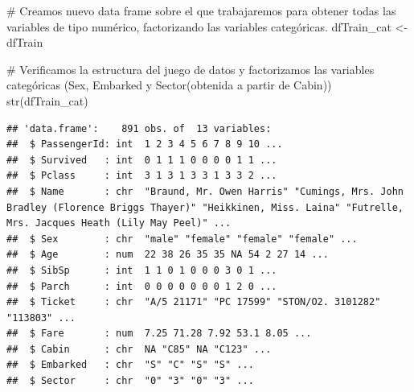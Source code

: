 \documentclass[
]{article}
\newenvironment{Shaded}{\begin{snugshade}}{\end{snugshade}}
\newcommand{\CommentTok}[1]{\textcolor[rgb]{0.50,0.62,0.50}{#1}}
\newcommand{\KeywordTok}[1]{\textcolor[rgb]{0.94,0.87,0.69}{#1}}
\newcommand{\NormalTok}[1]{\textcolor[rgb]{0.80,0.80,0.80}{#1}}
\newcommand{\StringTok}[1]{\textcolor[rgb]{0.80,0.58,0.58}{#1}}
\begin{document}
\begin{Shaded}
\begin{Highlighting}[]
\CommentTok{# Creamos nuevo data frame sobre el que trabajaremos para obtener todas las variables de tipo numérico, factorizando las variables categóricas. }
\NormalTok{dfTrain_cat <-}\StringTok{ }\NormalTok{dfTrain}

\CommentTok{# Verificamos la estructura del juego de datos y factorizamos las variables categóricas (Sex, Embarked y Sector(obtenida a partir de Cabin))}
\KeywordTok{str}\NormalTok{(dfTrain_cat)}
\end{Highlighting}
\end{Shaded}

\begin{verbatim}
## 'data.frame':    891 obs. of  13 variables:
##  $ PassengerId: int  1 2 3 4 5 6 7 8 9 10 ...
##  $ Survived   : int  0 1 1 1 0 0 0 0 1 1 ...
##  $ Pclass     : int  3 1 3 1 3 3 1 3 3 2 ...
##  $ Name       : chr  "Braund, Mr. Owen Harris" "Cumings, Mrs. John Bradley (Florence Briggs Thayer)" "Heikkinen, Miss. Laina" "Futrelle, Mrs. Jacques Heath (Lily May Peel)" ...
##  $ Sex        : chr  "male" "female" "female" "female" ...
##  $ Age        : num  22 38 26 35 35 NA 54 2 27 14 ...
##  $ SibSp      : int  1 1 0 1 0 0 0 3 0 1 ...
##  $ Parch      : int  0 0 0 0 0 0 0 1 2 0 ...
##  $ Ticket     : chr  "A/5 21171" "PC 17599" "STON/O2. 3101282" "113803" ...
##  $ Fare       : num  7.25 71.28 7.92 53.1 8.05 ...
##  $ Cabin      : chr  NA "C85" NA "C123" ...
##  $ Embarked   : chr  "S" "C" "S" "S" ...
##  $ Sector     : chr  "0" "3" "0" "3" ...
\end{verbatim}
\end{document}
